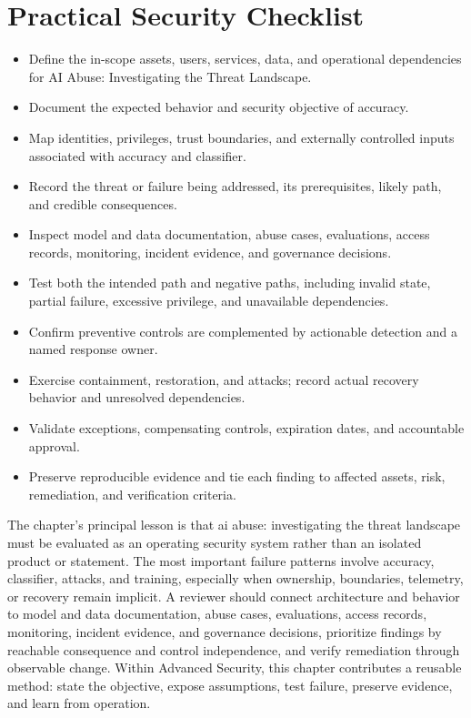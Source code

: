 \documentclass[11pt]{article}
\begin{document}
\section*{Practical Security Checklist}
\begin{itemize}[label=$\square$]
\item Define the in-scope assets, users, services, data, and operational dependencies for AI Abuse: Investigating the Threat Landscape.
\item Document the expected behavior and security objective of accuracy.
\item Map identities, privileges, trust boundaries, and externally controlled inputs associated with accuracy and classifier.
\item Record the threat or failure being addressed, its prerequisites, likely path, and credible consequences.
\item Inspect model and data documentation, abuse cases, evaluations, access records, monitoring, incident evidence, and governance decisions.
\item Test both the intended path and negative paths, including invalid state, partial failure, excessive privilege, and unavailable dependencies.
\item Confirm preventive controls are complemented by actionable detection and a named response owner.
\item Exercise containment, restoration, and attacks; record actual recovery behavior and unresolved dependencies.
\item Validate exceptions, compensating controls, expiration dates, and accountable approval.
\item Preserve reproducible evidence and tie each finding to affected assets, risk, remediation, and verification criteria.
\end{itemize}
\begin{synthesisbox}
The chapter's principal lesson is that ai abuse: investigating the threat landscape must be evaluated as an operating security system rather than an isolated product or statement. The most important failure patterns involve accuracy, classifier, attacks, and training, especially when ownership, boundaries, telemetry, or recovery remain implicit. A reviewer should connect architecture and behavior to model and data documentation, abuse cases, evaluations, access records, monitoring, incident evidence, and governance decisions, prioritize findings by reachable consequence and control independence, and verify remediation through observable change. Within Advanced Security, this chapter contributes a reusable method: state the objective, expose assumptions, test failure, preserve evidence, and learn from operation.
\end{synthesisbox}
\end{document}
